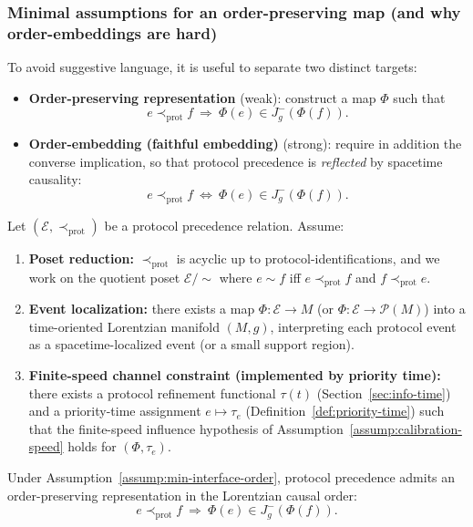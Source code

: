 \subsubsection{Minimal assumptions for an order-preserving map (and why order-embeddings are hard)}\label{sec:causality:minimal-assumptions}

To avoid suggestive language, it is useful to separate two distinct targets:
\begin{itemize}[leftmargin=*,itemsep=2pt]
  \item \textbf{Order-preserving representation} (weak): construct a map $\Phi$ such that
  \[
  e\prec_{\mathrm{prot}} f\ \Longrightarrow\ \Phi(e)\in J^-_g(\Phi(f)).
  \]
  \item \textbf{Order-embedding (faithful embedding)} (strong): require in addition the converse implication, so that protocol precedence is \emph{reflected} by spacetime causality:
  \[
  e\prec_{\mathrm{prot}} f\ \Longleftrightarrow\ \Phi(e)\in J^-_g(\Phi(f)).
  \]
\end{itemize}

\begin{assumption}\label{assump:min-interface-order}
Let $(\mathcal{E},\prec_{\mathrm{prot}})$ be a protocol precedence relation.
Assume:
\begin{enumerate}[label=(\roman*),leftmargin=*,itemsep=2pt]
  \item \textbf{Poset reduction:} $\prec_{\mathrm{prot}}$ is acyclic up to protocol-identifications, and we work on the quotient poset $\mathcal{E}/{\sim}$ where $e\sim f$ iff $e\prec_{\mathrm{prot}} f$ and $f\prec_{\mathrm{prot}} e$.
  \item \textbf{Event localization:} there exists a map $\Phi:\mathcal{E}\to M$ (or $\Phi:\mathcal{E}\to\mathcal{P}(M)$) into a time-oriented Lorentzian manifold $(M,g)$, interpreting each protocol event as a spacetime-localized event (or a small support region).
  \item \textbf{Finite-speed channel constraint (implemented by priority time):} there exists a protocol refinement functional $\tau(t)$ (Section~\ref{sec:info-time}) and a priority-time assignment $e\mapsto \tau_e$ (Definition~\ref{def:priority-time}) such that the finite-speed influence hypothesis of Assumption~\ref{assump:calibration-speed} holds for $(\Phi,\tau_e)$.
\end{enumerate}
\end{assumption}

\begin{corollary}\label{cor:min-interface-order-preserving}
Under Assumption~\ref{assump:min-interface-order}, protocol precedence admits an order-preserving representation in the Lorentzian causal order:
\[
e\prec_{\mathrm{prot}} f\ \Longrightarrow\ \Phi(e)\in J^-_g(\Phi(f)).
\]
\end{corollary}

